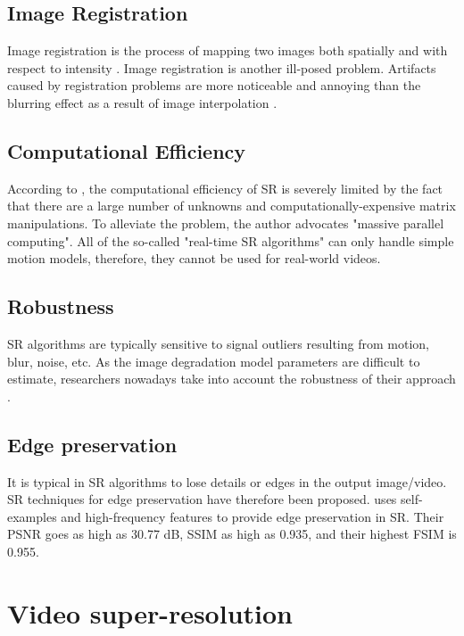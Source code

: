 \subsection{Image Registration}
Image registration is the process of mapping two images both spatially and with respect to intensity \citep{Brown1992}.
Image registration is another ill-posed problem.
Artifacts caused by registration problems are more noticeable and annoying than the blurring effect as a result of image interpolation \citep{Yang2010a}.
\subsection{Computational Efficiency}
According to \cite{Yang2010a}, the computational efficiency of SR is severely limited by the fact that there are a large number of unknowns and computationally-expensive matrix manipulations. 
To alleviate the problem, the author advocates "massive parallel computing".
All of the so-called "real-time SR algorithms" can only handle simple motion models, therefore, they cannot be used for real-world videos.

\subsection{Robustness}
SR algorithms are typically sensitive to signal outliers resulting from motion, blur, noise, etc. 
As the image degradation model parameters are difficult to estimate, researchers nowadays take into account the robustness of their approach \citep{Yang2010a}.

\subsection{Edge preservation}
It is typical in SR algorithms to lose details or edges in the output image/video. 
SR techniques for edge preservation have therefore been proposed. 
\cite{Vishnukumar2014} uses self-examples and high-frequency features to provide edge preservation in SR. Their PSNR goes as high as 30.77 dB, SSIM as high as 0.935, and their highest FSIM is 0.955.

\section{Video super-resolution}

